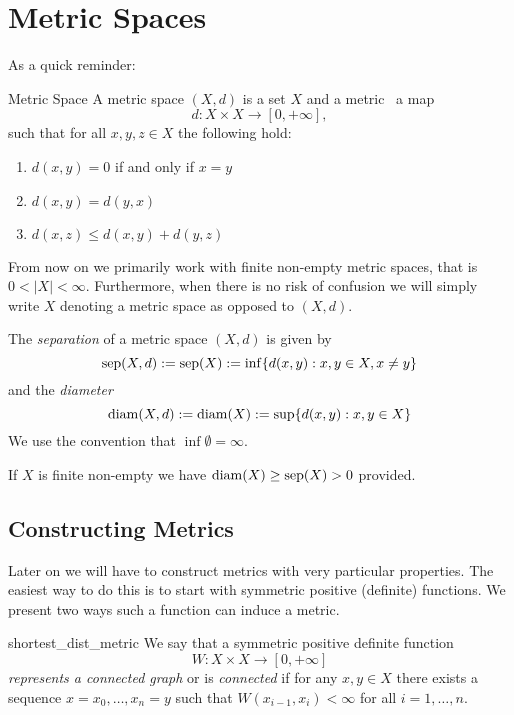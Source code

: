 \section{Metric Spaces}
As a quick reminder:
\begin{definition}{Metric Space}{}
A metric space $(X,d)$ is a set $X$ and a metric \Ie\ a map
\begin{equation*}
d: X \times X \to [0, +\infty],
\end{equation*}
such that for all $x,y,z \in X$ the following hold:
\begin{enumerate}
    \item $d(x,y) = 0$ if and only if $x = y$
    \item $d(x,y) = d(y,x)$
    \item $d(x,z) \leq d(x,y) + d(y,z)$
\end{enumerate}
\end{definition}
From now on we primarily work with finite non-empty metric spaces, that is $0 < |X| < \infty$.
Furthermore, when there is no risk of confusion we will simply write $X$ denoting a metric space as opposed to $(X,d)$.

\begin{definition}{}{}
The \emph{separation} of a metric space $(X,d)$ is given by
\begin{equation*}
\mathrm{sep}(X,d) := \mathrm{sep}(X) := \inf\{d(x,y): x,y \in X, x \neq y\}
\end{equation*}
and the \emph{diameter}
\begin{equation*}
\mathrm{diam}(X,d) := \mathrm{diam}(X) := \sup\{d(x,y): x,y \in X\}
\end{equation*}
We use the convention that $\inf \emptyset = \infty$.
\end{definition}

If $X$ is finite non-empty we have $\mathrm{diam}(X) \geq \mathrm{sep}(X) > 0$ provided.

\subsection{Constructing Metrics}
Later on we will have to construct metrics with very particular properties. The easiest way to do this is to start with symmetric positive (definite) functions. We present two ways such a function can induce a metric.

\begin{definition}{}{shortest_dist_metric}
We say that a symmetric positive definite function
$$
W: X \times X \to [0, +\infty]
$$
\emph{represents a connected graph} or is \emph{connected} if for any $x,y \in X$ there exists a sequence $x = x_0, \dots, x_n = y$ such that $W(x_{i-1}, x_{i}) < \infty$ for all $i = 1, \dots, n$.
\end{definition}

